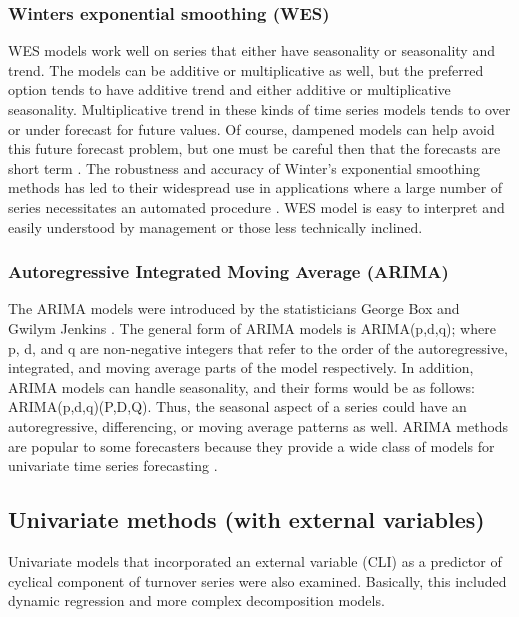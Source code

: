 \subsubsection{Winters exponential smoothing (WES)}
WES models work well on series that either have seasonality or seasonality and trend.  The models can be additive or multiplicative as well, but the preferred option tends to have additive trend and either additive or multiplicative seasonality.  Multiplicative trend in these kinds of time series models tends to over or under forecast for future values. Of course, dampened models can help avoid this future forecast problem, but one must be careful then that the forecasts are short term \citep{de1998}. The robustness and accuracy of Winter’s exponential smoothing methods has led to their widespread use in applications where a large number of series necessitates an automated procedure \citep{win1960,tay2003}. WES model is easy to interpret and easily understood by management or those less technically inclined. 
\subsubsection{Autoregressive Integrated Moving Average (ARIMA)}
The ARIMA models were introduced by the statisticians George Box and Gwilym Jenkins \citep{box1970}. The general form of ARIMA models is ARIMA(p,d,q); where p, d, and q are non-negative integers that refer to the order of the autoregressive, integrated, and moving average parts of the model respectively. In addition, ARIMA models can handle seasonality, and their forms would be as follows: ARIMA(p,d,q)(P,D,Q). Thus, the seasonal aspect of a series could have an autoregressive, differencing, or moving average patterns as well.  ARIMA methods are popular to some forecasters because they provide a wide class of models for univariate time series forecasting \citep{har1983}.  

\subsection{Univariate methods (with external variables)}
Univariate models that incorporated an external variable (CLI) as a predictor of cyclical component of turnover series were also examined.  Basically, this included dynamic regression and more complex decomposition models.
